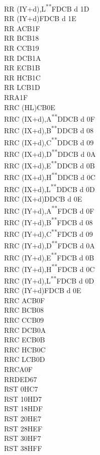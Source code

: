 \documentclass[12pt,twoside,openright,a4paper]{book}
\newcommand{\UNDOC}{\textnormal{\textsuperscript{**}}}
\begin{document}
\begin{multicols}{3}
{\begin{tabbing}
	RR (IY+d),L\UNDOC\>FDCB d 1D\\
	RR (IY+d)\>FDCB d 1E\\
	RR A\>CB1F\\
	RR B\>CB18\\
	RR C\>CB19\\
	RR D\>CB1A\\
	RR E\>CB1B\\
	RR H\>CB1C\\
	RR L\>CB1D\\
	RRA\>1F\\
	RRC (HL)\>CB0E\\
	RRC (IX+d),A\UNDOC\>DDCB d 0F\\
	RRC (IX+d),B\UNDOC\>DDCB d 08\\
	RRC (IX+d),C\UNDOC\>DDCB d 09\\
	RRC (IX+d),D\UNDOC\>DDCB d 0A\\
	RRC (IX+d),E\UNDOC\>DDCB d 0B\\
	RRC (IX+d),H\UNDOC\>DDCB d 0C\\
	RRC (IX+d),L\UNDOC\>DDCB d 0D\\
	RRC (IX+d)\>DDCB d 0E\\
	RRC (IY+d),A\UNDOC\>FDCB d 0F\\
	RRC (IY+d),B\UNDOC\>FDCB d 08\\
	RRC (IY+d),C\UNDOC\>FDCB d 09\\
	RRC (IY+d),D\UNDOC\>FDCB d 0A\\
	RRC (IY+d),E\UNDOC\>FDCB d 0B\\
	RRC (IY+d),H\UNDOC\>FDCB d 0C\\
	RRC (IY+d),L\UNDOC\>FDCB d 0D\\
	RRC (IY+d)\>FDCB d 0E\\
	RRC A\>CB0F\\
	RRC B\>CB08\\
	RRC C\>CB09\\
	RRC D\>CB0A\\
	RRC E\>CB0B\\
	RRC H\>CB0C\\
	RRC L\>CB0D\\
	RRCA\>0F\\
	RRD\>ED67\\
	RST 0H\>C7\\
	RST 10H\>D7\\
	RST 18H\>DF\\
	RST 20H\>E7\\
	RST 28H\>EF\\
	RST 30H\>F7\\
	RST 38H\>FF\\

\end{tabbing}}
\end{multicols}
\end{document}

